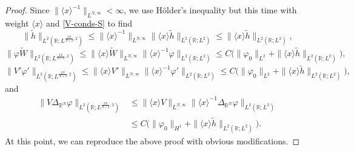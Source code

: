 \documentclass[10pt,a4paper]{amsart}
\newcommand{\R}{\mathbb{R}}
\begin{document}
\begin{proof}
Since $\|\langle x\rangle ^{-1}\|_{L^{N,\infty}}<\infty$, we use H\" older's inequality but this time with weight $\langle x\rangle$ and \eqref{V-conds-S} to find
$$ \| \tilde{h} \|_{L^2 (\R ; L^{\frac{2N}{N+2} ,2})} \leq \|\langle x\rangle ^{-1}\|_{L^{N,\infty}} \|\langle x\rangle  \tilde{h}\|_{L^2 (\R ; L^2)}\leq  \|\langle x\rangle  \tilde{h}\|_{L^2 (\R ; L^2)},$$
$$ \| \varphi\tilde{W} \|_{L^2 (\R ; L^{\frac{2N}{N+2} ,2})} \leq \|\langle x\rangle \tilde{W}\|_{L^{N,\infty}} \|\langle x\rangle ^{-1} \varphi\|_{L^2 (\R ; L^2)}\leq C \big(\|\varphi_0\|_{L^2} + \|\langle x\rangle  \tilde{h}\|_{L^2 (\R ; L^2)}\big), $$
$$ \| V' \varphi ' \|_{L^2 (\R ; L^{\frac{2N}{N+2} ,2})} \leq \|\langle x\rangle V' \|_{L^{N,\infty}} \|\langle x\rangle ^{-1} \varphi ' \|_{L^2 (\R ; L^2)}\leq C \big(\|\varphi_0\|_{L^2} + \|\langle x\rangle  \tilde{h}\|_{L^2 (\R ; L^2)}\big) ,$$
and
\begin{align*}
\| V\Delta_{\R^N} \varphi \|_{L^2 (\R ; L^{\frac{2N}{N+2} ,2})} &\leq \|\langle x\rangle V \|_{L^{N,\infty}} \|\langle x\rangle ^{-1} \Delta_{\R^N} \varphi \|_{L^2 (\R ; L^2)} \\
&\leq C  \big(\|\varphi_0\|_{H^1} + \|\langle x\rangle  \tilde{h}\|_{L^2 (\R ; L^2)}\big) .
\end{align*} 
At this point, we can reproduce the above proof with obvious modifications.
\end{proof}
\end{document}

